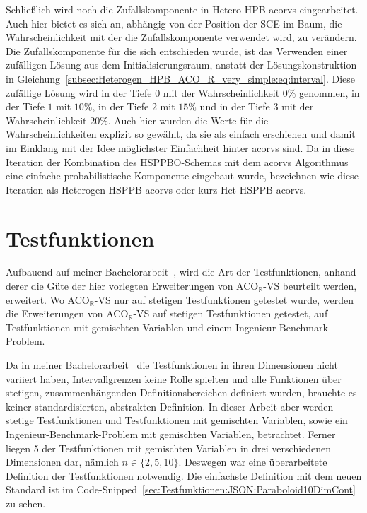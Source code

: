 \documentclass[fontsize=12, a4aper]{scrartcl}
\begin{document}
	\noindent Schließlich wird noch die Zufallskomponente in Hetero-HPB-\ac{acorvs} eingearbeitet. Auch hier bietet es sich an, abhängig von der Position der SCE im Baum, die Wahrscheinlichkeit mit der die Zufallskomponente verwendet wird, zu verändern. Die Zufallskomponente für die sich entschieden wurde, ist das Verwenden einer zufälligen Lösung aus dem Initialisierungsraum, anstatt der Lösungskonstruktion in Gleichung~\ref{subsec:Heterogen_HPB_ACO_R_very_simple:eq:interval}. Diese zufällige Lösung wird in der Tiefe \(0\) mit der Wahrscheinlichkeit \(0\%\) genommen, in der Tiefe \(1\) mit \(10\%\), in der Tiefe \(2\) mit \(15\%\) und in der Tiefe \(3\) mit der Wahrscheinlichkeit \(20\%\). Auch hier wurden die Werte für die Wahrscheinlichkeiten explizit so gewählt, da sie als einfach erschienen und damit im Einklang mit der Idee möglichster Einfachheit hinter \ac{acorvs} sind. Da in diese Iteration der Kombination des HSPPBO-Schemas mit dem \ac{acorvs} Algorithmus eine einfache probabilistische Komponente eingebaut wurde, bezeichnen wie diese Iteration als Heterogen-HSPPB-\ac{acorvs} oder kurz Het-HSPPB-\ac{acorvs}.
	
	\section{Testfunktionen} \label{sec:Testfunktionen}
	
	Aufbauend auf meiner Bachelorarbeit~\cite{FCM_2019}, wird die Art der Testfunktionen, anhand derer die Güte der hier vorlegten Erweiterungen von ACO\(_\mathbb{R}\)-VS beurteilt werden, erweitert. Wo ACO\(_{\mathbb{R}}\)-VS nur auf stetigen Testfunktionen getestet wurde, werden die Erweiterungen von ACO\(_{\mathbb{R}}\)-VS auf stetigen Testfunktionen getestet, auf Testfunktionen mit gemischten Variablen und einem Ingenieur-Benchmark-Problem.\hfill\newline
	
	Da in meiner Bachelorarbeit~\cite{FCM_2019} die Testfunktionen in ihren Dimensionen nicht variiert haben, Intervallgrenzen keine Rolle spielten und alle Funktionen über stetigen, zusammenhängenden Definitionsbereichen definiert wurden, brauchte es keiner standardisierten, abstrakten Definition. In dieser Arbeit aber werden stetige Testfunktionen und Testfunktionen mit gemischten Variablen, sowie ein Ingenieur-Benchmark-Problem mit gemischten Variablen, betrachtet. Ferner liegen 5 der Testfunktionen mit gemischten Variablen in drei verschiedenen Dimensionen dar, nämlich \(n \in \{2, 5, 10\}\). Deswegen war eine überarbeitete Definition der Testfunktionen notwendig. Die einfachste Definition mit dem neuen Standard ist im Code-Snipped~\ref{sec:Testfunktionen:JSON:Paraboloid10DimCont} zu sehen.
	
\end{document}
